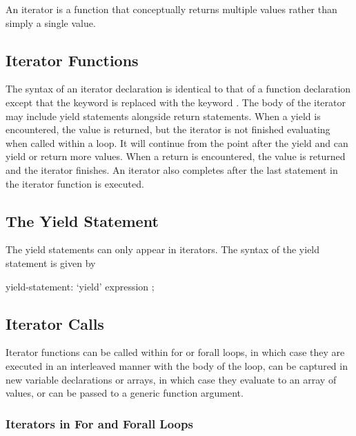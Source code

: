 \label{Iterators}

An iterator is a function that conceptually returns multiple values
rather than simply a single value.

\subsection{Iterator Functions}
\label{Iterator_Functions}

The syntax of an iterator declaration is identical to that of a
function declaration except that the keyword  is replaced
with the keyword .  The body of the iterator may
include yield statements alongside return statements.  When a yield is
encountered, the value is returned, but the iterator is not finished
evaluating when called within a loop.  It will continue from the point
after the yield and can yield or return more values.  When a return is
encountered, the value is returned and the iterator finishes.  An
iterator also completes after the last statement in the iterator
function is executed.

\subsection{The Yield Statement}
\label{The_Yield_Statement}

The yield statements can only appear in iterators.  The syntax of the
yield statement is given by
\begin{syntax}
yield-statement:
  `yield' expression ;
\end{syntax}

\subsection{Iterator Calls}
\label{Iterator_Calls}

Iterator functions can be called within for or forall loops, in which
case they are executed in an interleaved manner with the body of the
loop, can be captured in new variable declarations or arrays, in which
case they evaluate to an array of values, or can be passed to a
generic function argument.

\subsubsection{Iterators in For and Forall Loops}
\label{Iterators_in_For_and_Forall_Loops}

